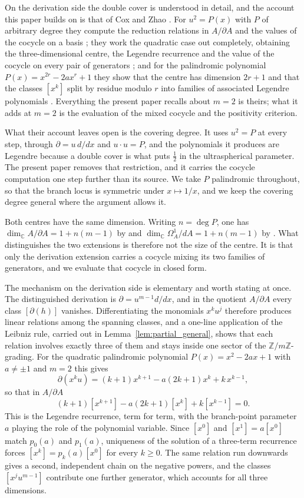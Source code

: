 \documentclass[11pt]{amsart}
\theoremstyle{definition}
\theoremstyle{remark}
\newcommand{\C}{\mathbb{C}}
\newcommand{\Z}{\mathbb{Z}}
\newcommand{\pa}{\partial}
\begin{document}
On the derivation side the double cover is understood in detail, and the account
this paper builds on is that of Cox and Zhao \cite{CoxZhao2018}. For $u^2=P(x)$
with $P$ of arbitrary degree they compute the reduction relations in $A/\pa A$
and the values of the cocycle on a basis \cite[\S2.1]{CoxZhao2018}; they work the
quadratic case out completely, obtaining the three-dimensional centre, the
Legendre recurrence and the value of the cocycle on every pair of generators
\cite[\S2.2]{CoxZhao2018}; and for the palindromic polynomial
$P(x)=x^{2r}-2ax^{r}+1$ they show that the centre has dimension $2r+1$ and that
the classes $[x^k]$ split by residue modulo $r$ into families of associated
Legendre polynomials \cite[\S2.4]{CoxZhao2018}. Everything the present paper
recalls about $m=2$ is theirs; what it adds at $m=2$ is the evaluation of the
mixed cocycle and the positivity criterion.

What their account leaves open is the covering degree. It uses $u^2=P$ at every
step, through $\pa=u\,d/dx$ and $u\cdot u=P$, and the polynomials it produces are
Legendre because a double cover is what puts $\tfrac12$ in the ultraspherical
parameter. The present paper removes that restriction, and it carries the cocycle
computation one step further than its source. We take $P$ palindromic throughout,
so that the branch locus is symmetric under $x\mapsto1/x$, and we keep the
covering degree general where the argument allows it.

Both centres have the same dimension. Writing $n=\deg P$, one has
$\dim_\C A/\partial A = 1+n(m-1)$ by \cite[Theorem~9]{CoxGuoLuZhao2017} and
$\dim_\C\Omega^1_A/dA = 1+n(m-1)$ by \cite[Theorem~2.4]{Santos2022}. What
distinguishes the two extensions is therefore not the size of the centre. It is
that only the derivation extension carries a cocycle mixing its two families of
generators, and we evaluate that cocycle in closed form.

The mechanism on the derivation side is elementary and worth stating at once.
The distinguished derivation is $\partial=u^{m-1}d/dx$, and in the quotient
$A/\partial A$ every class $[\partial(h)]$ vanishes. Differentiating the
monomials $x^ku^{j}$ therefore produces linear relations among the spanning
classes, and a one-line application of the Leibniz rule, carried out in
Lemma~\ref{lem:partial_general}, shows that each relation involves exactly three
of them and stays inside one sector of the $\Z/m\Z$-grading. For the quadratic
palindromic polynomial $P(x)=x^2-2ax+1$ with $a\neq\pm1$ and $m=2$ this gives
\[
  \partial(x^ku) = (k+1)x^{k+1} - a(2k+1)x^k + k\,x^{k-1},
\]
so that in $A/\partial A$
\begin{equation}\label{eq:rec_intro}
  (k+1)[x^{k+1}] - a(2k+1)[x^k] + k[x^{k-1}] = 0 .
\end{equation}
This is the Legendre recurrence, term for term, with the branch-point
parameter $a$ playing the role of the polynomial variable. Since
$[x^0]$ and $[x^1]=a[x^0]$ match $p_0(a)$ and $p_1(a)$, uniqueness of the
solution of a three-term recurrence forces $[x^k]=p_k(a)[x^0]$ for every
$k\geq0$. The same relation run downwards gives a second, independent chain on
the negative powers, and the classes $[x^ju^{m-1}]$ contribute one further
generator, which accounts for all three dimensions.
\end{document}
